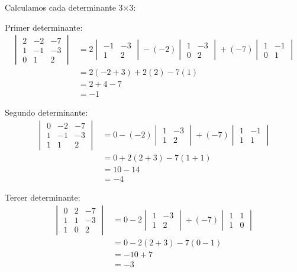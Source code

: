 \documentclass{article}
\begin{document}
Calculamos cada determinante 3×3:

Primer determinante:
\begin{align}
    \begin{vmatrix} 2 & -2 & -7 \\ 1 & -1 & -3 \\ 0 & 1 & 2 \end{vmatrix} &= 2 \begin{vmatrix} -1 & -3 \\ 1 & 2 \end{vmatrix} - (-2) \begin{vmatrix} 1 & -3 \\ 0 & 2 \end{vmatrix} + (-7) \begin{vmatrix} 1 & -1 \\ 0 & 1 \end{vmatrix} \\
    &= 2(-2 + 3) + 2(2) - 7(1) \\
    &= 2 + 4 - 7 \\
    &= -1
\end{align}

Segundo determinante:
\begin{align}
    \begin{vmatrix} 0 & -2 & -7 \\ 1 & -1 & -3 \\ 1 & 1 & 2 \end{vmatrix} &= 0 - (-2) \begin{vmatrix} 1 & -3 \\ 1 & 2 \end{vmatrix} + (-7) \begin{vmatrix} 1 & -1 \\ 1 & 1 \end{vmatrix} \\
    &= 0 + 2(2 + 3) - 7(1 + 1) \\
    &= 10 - 14 \\
    &= -4
\end{align}

Tercer determinante:
\begin{align}
    \begin{vmatrix} 0 & 2 & -7 \\ 1 & 1 & -3 \\ 1 & 0 & 2 \end{vmatrix} &= 0 - 2 \begin{vmatrix} 1 & -3 \\ 1 & 2 \end{vmatrix} + (-7) \begin{vmatrix} 1 & 1 \\ 1 & 0 \end{vmatrix} \\
    &= 0 - 2(2 + 3) - 7(0 - 1) \\
    &= -10 + 7 \\
    &= -3
\end{align}
\end{document}
